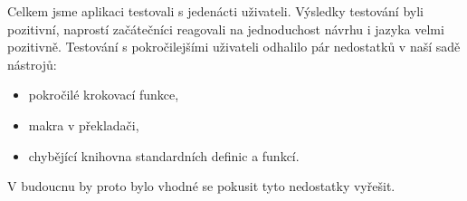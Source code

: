 Celkem jsme aplikaci testovali s jedenácti uživateli. Výsledky testování byli pozitivní, naprostí začátečníci reagovali na jednoduchost návrhu i jazyka velmi pozitivně. Testování s pokročilejšími uživateli odhalilo pár nedostatků v naší sadě nástrojů:

\begin{itemize}
	\item pokročilé krokovací funkce,
	\item makra v překladači,
	\item chybějící knihovna standardních definic a funkcí.
\end{itemize}

V budoucnu by proto bylo vhodné se pokusit tyto nedostatky vyřešit.